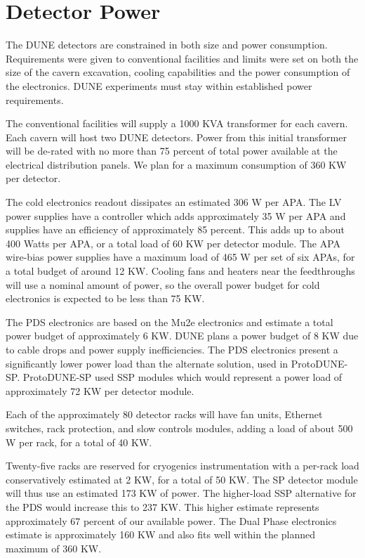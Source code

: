\section{Detector Power}
\label{sec:fdsp-coord-faci-power}

The DUNE detectors are constrained in both size and power consumption.
Requirements were given to conventional facilities and limits were set
on both the size of the cavern excavation, cooling capabilities and
the power consumption of the electronics. DUNE experiments must stay
within established power requirements.

The conventional facilities will supply a 1000 KVA transformer for
each cavern.  Each cavern will host two DUNE detectors.  Power from
this initial transformer will be de-rated with no more than 75 percent
of total power available at the electrical distribution panels.  We
plan for a maximum consumption of 360 KW per detector.

The cold electronics readout dissipates an estimated 306 W per
APA. The LV power supplies have a controller which adds approximately
35 W per APA and supplies have an efficiency of approximately 85
percent. This adds up to about 400 Watts per APA, or a total load of
60 KW per detector module. The APA wire-bias power supplies have a
maximum load of 465 W per set of six APAs, for a total budget of
around 12 KW. Cooling fans and heaters near the feedthroughs will use
a nominal amount of power, so the overall power budget for cold
electronics is expected to be less than 75 KW.

The PDS electronics are based on the Mu2e electronics and estimate a
total power budget of approximately 6 KW. DUNE plans a power budget of
8 KW due to cable drops and power supply inefficiencies.  The PDS
electronics present a significantly lower power load than the
alternate solution, used in ProtoDUNE-SP.  ProtoDUNE-SP used SSP
modules which would represent a power load of approximately 72 KW per
detector module.

Each of the approximately 80 detector racks will have fan units,
Ethernet switches, rack protection, and slow controls modules, adding
a load of about 500 W per rack, for a total of 40 KW.

Twenty-five racks are reserved for cryogenics instrumentation with a
per-rack load conservatively estimated at 2 KW, for a total of 50 KW.
The SP detector module will thus use an estimated 173 KW of power. The
higher-load SSP alternative for the PDS would increase this to 237
KW. This higher estimate represents approximately 67 percent of our
available power. The Dual Phase electronics estimate is approximately
160 KW and also fits well within the planned maximum of 360 KW.


